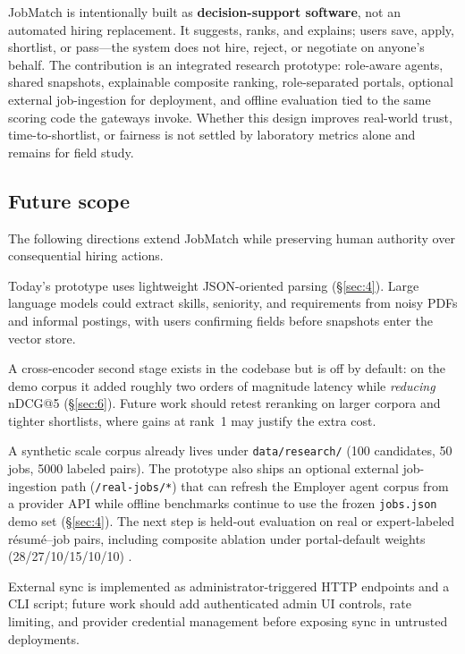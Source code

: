 JobMatch is intentionally built as \textbf{decision-support software}, not an automated hiring replacement.
It suggests, ranks, and explains; users save, apply, shortlist, or pass---the system does not hire, reject, or negotiate on anyone's behalf.
The contribution is an integrated research prototype: role-aware agents, shared snapshots, explainable composite ranking, role-separated portals, optional external job-ingestion for deployment, and offline evaluation tied to the same scoring code the gateways invoke.
Whether this design improves real-world trust, time-to-shortlist, or fairness is not settled by laboratory metrics alone and remains for field study.

\subsection{Future scope}\label{sec:7-future}

The following directions extend JobMatch while preserving human authority over consequential hiring actions.

Today's prototype uses lightweight JSON-oriented parsing (\S\ref{sec:4}).
Large language models could extract skills, seniority, and requirements from noisy PDFs and informal postings, with users confirming fields before snapshots enter the vector store.

A cross-encoder second stage exists in the codebase but is off by default: on the demo corpus it added roughly two orders of magnitude latency while \emph{reducing} nDCG@5 (\S\ref{sec:6}).
Future work should retest reranking on larger corpora and tighter shortlists, where gains at rank~1 may justify the extra cost.

A synthetic scale corpus already lives under \texttt{data/research/} (100 candidates, 50 jobs, 5000 labeled pairs).
The prototype also ships an optional external job-ingestion path (\texttt{/real-jobs/*}) that can refresh the Employer agent corpus from a provider API while offline benchmarks continue to use the frozen \texttt{jobs.json} demo set (\S\ref{sec:4}).
The next step is held-out evaluation on real or expert-labeled résumé--job pairs, including composite ablation under portal-default weights (28/27/10/15/10/10) .

External sync is implemented as administrator-triggered HTTP endpoints and a CLI script; future work should add authenticated admin UI controls, rate limiting, and provider credential management before exposing sync in untrusted deployments.

